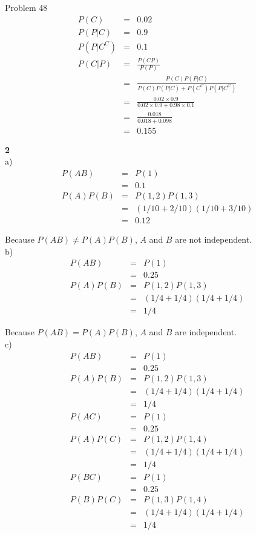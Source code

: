 \documentclass[12pt]{article}
\begin{document}
Problem 48\\
\begin{eqnarray*}
P(C) &=& 0.02 \\
P(P|C) &=& 0.9 \\
P(P|C^C) &=& 0.1 \\
P(C|P)
&=& \frac {P(CP)}{P(P)} \\
&=& \frac {P(C)P(P|C)}{P(C)P(P|C) + P(C^C)P(P|C^C)} \\
&=& \frac {0.02 \times 0.9}{0.02 \times 0.9 + 0.98 \times 0.1} \\
&=& \frac {0.018}{0.018 + 0.098} \\
&=& 0.155
\end{eqnarray*}

{\bf 2} \\
a)
\begin{eqnarray*}
P(AB)
&=& P({1}) \\
&=& 0.1 \\
P(A)P(B)
&=& P({1,2})P({1,3}) \\
&=& (1/10 + 2/10)(1/10 + 3/10) \\
&=& 0.12
\end{eqnarray*}

Because $P(AB) \neq P(A)P(B)$, $A$ and $B$ are not independent. \\

b) 
\begin{eqnarray*}
P(AB)
&=& P({1}) \\
&=& 0.25 \\
P(A)P(B)
&=& P({1,2})P({1,3}) \\
&=& (1/4 + 1/4)(1/4 + 1/4) \\
&=& 1/4
\end{eqnarray*}

Because $P(AB) = P(A)P(B)$, $A$ and $B$ are independent. \\

c)
\begin{eqnarray*}
P(AB)
&=& P({1}) \\
&=& 0.25 \\
P(A)P(B)
&=& P({1,2})P({1,3}) \\
&=& (1/4 + 1/4)(1/4 + 1/4) \\
&=& 1/4 \\
P(AC)
&=& P({1}) \\
&=& 0.25 \\
P(A)P(C)
&=& P({1,2})P({1,4}) \\
&=& (1/4 + 1/4)(1/4 + 1/4) \\
&=& 1/4 \\
P(BC)
&=& P({1}) \\
&=& 0.25 \\
P(B)P(C)
&=& P({1,3})P({1,4}) \\
&=& (1/4 + 1/4)(1/4 + 1/4) \\
&=& 1/4 \\
\end{eqnarray*}
\end{document}
